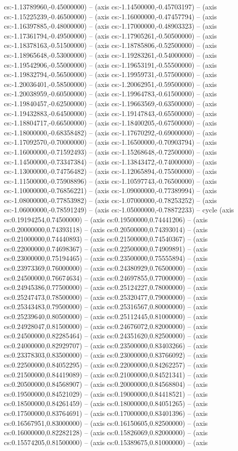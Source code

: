 cs:-1.13789960,-0.45000000) -- (axis cs:-1.14500000,-0.45703197) -- (axis cs:-1.15225239,-0.46500000) -- (axis cs:-1.16000000,-0.47457794) -- (axis cs:-1.16397885,-0.48000000) -- (axis cs:-1.17000000,-0.48903323) -- (axis cs:-1.17361794,-0.49500000) -- (axis cs:-1.17905261,-0.50500000) -- (axis cs:-1.18378163,-0.51500000) -- (axis cs:-1.18785806,-0.52500000) -- (axis cs:-1.18965648,-0.53000000) -- (axis cs:-1.19283261,-0.54000000) -- (axis cs:-1.19542906,-0.55000000) -- (axis cs:-1.19653191,-0.55500000) -- (axis cs:-1.19832794,-0.56500000) -- (axis cs:-1.19959731,-0.57500000) -- (axis cs:-1.20036401,-0.58500000) -- (axis cs:-1.20062951,-0.59500000) -- (axis cs:-1.20038959,-0.60500000) -- (axis cs:-1.19964783,-0.61500000) -- (axis cs:-1.19840457,-0.62500000) -- (axis cs:-1.19663569,-0.63500000) -- (axis cs:-1.19432883,-0.64500000) -- (axis cs:-1.19147843,-0.65500000) -- (axis cs:-1.18804717,-0.66500000) -- (axis cs:-1.18400205,-0.67500000) -- (axis cs:-1.18000000,-0.68358482) -- (axis cs:-1.17670292,-0.69000000) -- (axis cs:-1.17092570,-0.70000000) -- (axis cs:-1.16500000,-0.70903794) -- (axis cs:-1.16000000,-0.71592493) -- (axis cs:-1.15268648,-0.72500000) -- (axis cs:-1.14500000,-0.73347384) -- (axis cs:-1.13843472,-0.74000000) -- (axis cs:-1.13000000,-0.74756482) -- (axis cs:-1.12065894,-0.75500000) -- (axis cs:-1.11500000,-0.75908896) -- (axis cs:-1.10597743,-0.76500000) -- (axis cs:-1.10000000,-0.76856221) -- (axis cs:-1.09000000,-0.77389994) -- (axis cs:-1.08000000,-0.77853982) -- (axis cs:-1.07000000,-0.78253252) -- (axis cs:-1.06000000,-0.78591249) -- (axis cs:-1.05000000,-0.78872233) -- cycle (axis cs:0.19194254,0.74500000) -- (axis cs:0.19500000,0.74441206) -- (axis cs:0.20000000,0.74393118) -- (axis cs:0.20500000,0.74393014) -- (axis cs:0.21000000,0.74440893) -- (axis cs:0.21500000,0.74540367) -- (axis cs:0.22000000,0.74698367) -- (axis cs:0.22500000,0.74909891) -- (axis cs:0.23000000,0.75194465) -- (axis cs:0.23500000,0.75555894) -- (axis cs:0.23973369,0.76000000) -- (axis cs:0.24380929,0.76500000) -- (axis cs:0.24500000,0.76674634) -- (axis cs:0.24697855,0.77000000) -- (axis cs:0.24945386,0.77500000) -- (axis cs:0.25124227,0.78000000) -- (axis cs:0.25247473,0.78500000) -- (axis cs:0.25320477,0.79000000) -- (axis cs:0.25343483,0.79500000) -- (axis cs:0.25316567,0.80000000) -- (axis cs:0.25239640,0.80500000) -- (axis cs:0.25112445,0.81000000) -- (axis cs:0.24928047,0.81500000) -- (axis cs:0.24676072,0.82000000) -- (axis cs:0.24500000,0.82285464) -- (axis cs:0.24351620,0.82500000) -- (axis cs:0.24000000,0.82929707) -- (axis cs:0.23500000,0.83403266) -- (axis cs:0.23378303,0.83500000) -- (axis cs:0.23000000,0.83766092) -- (axis cs:0.22500000,0.84052295) -- (axis cs:0.22000000,0.84262257) -- (axis cs:0.21500000,0.84419089) -- (axis cs:0.21000000,0.84521341) -- (axis cs:0.20500000,0.84568907) -- (axis cs:0.20000000,0.84568804) -- (axis cs:0.19500000,0.84521029) -- (axis cs:0.19000000,0.84418521) -- (axis cs:0.18500000,0.84261459) -- (axis cs:0.18000000,0.84051265) -- (axis cs:0.17500000,0.83764691) -- (axis cs:0.17000000,0.83401396) -- (axis cs:0.16567951,0.83000000) -- (axis cs:0.16150605,0.82500000) -- (axis cs:0.16000000,0.82282128) -- (axis cs:0.15826069,0.82000000) -- (axis cs:0.15574205,0.81500000) -- (axis cs:0.15389675,0.81000000) -- (axis 